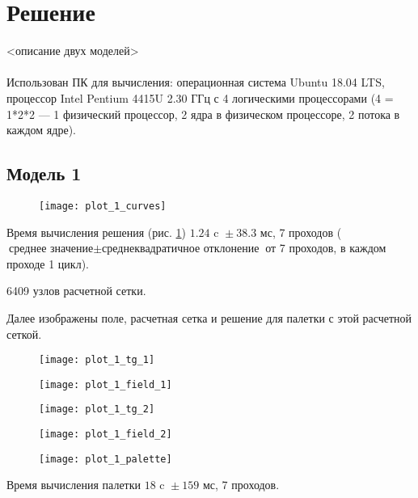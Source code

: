 \section{Решение}

<описание двух моделей>
\\\\
Использован ПК для вычисления: операционная система Ubuntu 18.04 LTS, процессор Intel Pentium 4415U 2.30 ГГц с 4 логическими процессорами
(4 = 1*2*2 --- 1 физический процессор, 2 ядра в физическом процессоре, 2 потока в каждом ядре).


\subsection{Модель 1}

\begin{figure}[H]
\texttt{[image: plot\_1\_curves]}
\caption{}
\label{fig:plot_1_curves}
\end{figure}

Время вычисления решения (рис. \ref{fig:plot_1_curves}) $1.24 \text{ c } \pm 38.3 \text{ мс}$, 7 проходов
($\text{среднее значение} \pm \text{среднеквадратичное отклонение}$ от 7 проходов, в каждом проходе 1 цикл).

6409 узлов расчетной сетки.

Далее изображены поле, расчетная сетка и решение для палетки с этой расчетной сеткой.

\begin{figure}[H]
\centering
\texttt{[image: plot\_1\_tg\_1]}
\caption{}
\end{figure}

\begin{figure}[H]
\centering
\texttt{[image: plot\_1\_field\_1]}
\caption{}
\end{figure}

\begin{figure}[H]
\texttt{[image: plot\_1\_tg\_2]}
\caption{}
\end{figure}

\begin{figure}[H]
\texttt{[image: plot\_1\_field\_2]}
\caption{}
\end{figure}

\begin{figure}[H]
\texttt{[image: plot\_1\_palette]}
\caption{}
\end{figure}

Время вычисления палетки $18 \text{ c } \pm 159 \text{ мс}$, 7 проходов.


